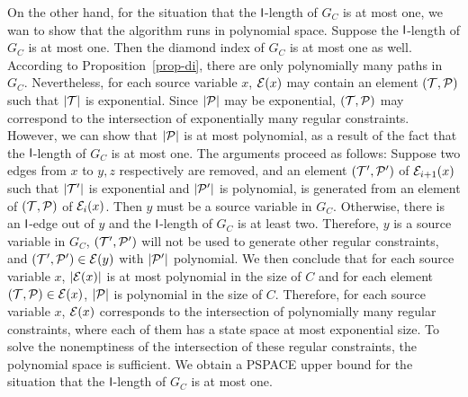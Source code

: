 On the other hand, for the situation that the $\mathsf{l}$-length of $G_C$ is at most one, we wan to show that the algorithm runs in polynomial space. Suppose the $\mathsf{l}$-length of $G_C$ is at most one. Then the diamond index of $G_C$ is at most one as well. According to Proposition~\ref{prop-di}, there are only polynomially many paths in $G_C$. Nevertheless, for each source variable $x$, $\mathcal{E}(x)$ may contain an element $(\mathcal{T},\mathcal{P})$ such that $|\mathcal{T}|$ is exponential. Since $|\mathcal{P}|$ may be exponential, $(\mathcal{T},\mathcal{P})$ may correspond to the intersection of exponentially many regular constraints. However, we can show that $|\mathcal{P}|$ is at most polynomial, as a result of the fact that the $\mathsf{l}$-length of $G_C$ is at most one. The arguments proceed as follows: Suppose two edges from $x$ to $y, z$ respectively are removed, and an element $(\mathcal{T}', \mathcal{P}')$ of $\mathcal{E}_{i+1}(x)$ such that $|\mathcal{T}'|$ is exponential and $|\mathcal{P}'|$ is polynomial, is generated from an element of $(\mathcal{T}, \mathcal{P})$ of $\mathcal{E}_i(x)$. Then $y$ must be a source variable in $G_C$. Otherwise, there is an $\mathsf{l}$-edge out of $y$ and the $\mathsf{l}$-length of $G_C$ is at least two. Therefore, $y$ is a source variable in $G_C$, $(\mathcal{T}', \mathcal{P}')$  will not be used to generate other regular constraints, and $(\mathcal{T}', \mathcal{P}') \in \mathcal{E}(y)$ with $|\mathcal{P}'|$ polynomial. We then conclude that for each source variable $x$, $|\mathcal{E}(x)|$  is at most polynomial in the size of $C$ and for each element $(\mathcal{T}, \mathcal{P}) \in \mathcal{E}(x)$, $|\mathcal{P}|$ is polynomial in the size of $C$. Therefore, for each source variable $x$,  $\mathcal{E}(x)$ corresponds to the intersection of polynomially many regular constraints, where each of them has a state space at most exponential size. To solve the nonemptiness of the intersection of these regular constraints, the polynomial space is sufficient. We obtain a PSPACE upper bound for the situation that the $\mathsf{l}$-length of $G_C$ is at most one.



